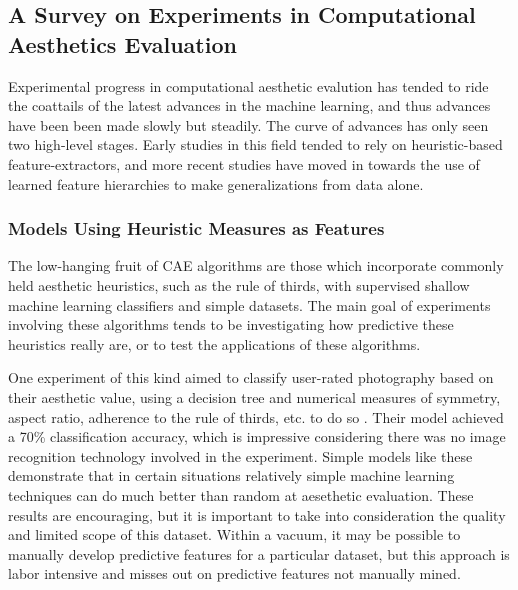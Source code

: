 \documentclass[midd]{thesis}
\begin{document}
\subsection{A Survey on Experiments in Computational Aesthetics Evaluation}

Experimental progress in computational aesthetic evalution has tended to ride the coattails of the latest advances in the machine learning, and thus advances have been been made slowly but steadily. The curve of advances has only seen two high-level stages. Early studies in this field tended to rely on heuristic-based feature-extractors, and more recent studies have moved in towards the use of learned feature hierarchies to make generalizations from data alone.

\subsubsection{Models Using Heuristic Measures as Features}


The low-hanging fruit of CAE algorithms are those which incorporate commonly held aesthetic heuristics, such as the rule of thirds, with supervised shallow machine learning classifiers and simple datasets. The main goal of experiments involving these algorithms tends to be investigating how predictive these heuristics really are, or to test the applications of these algorithms.

One experiment of this kind aimed to classify user-rated photography based on their aesthetic value, using a decision tree and numerical measures of symmetry, aspect ratio, adherence to the rule of thirds, etc. to do so \cite{zhou2014computational}. Their model achieved a 70\% classification accuracy, which is impressive considering there was no image recognition technology involved in the experiment. Simple models like these demonstrate that in certain situations relatively simple machine learning techniques can do much better than random at aesethetic evaluation. These results are encouraging, but it is important to take into consideration the quality and limited scope of this dataset. Within a vacuum, it may be possible to manually develop predictive features for a particular dataset, but this approach is labor intensive and misses out on predictive features not manually mined.
\end{document}
